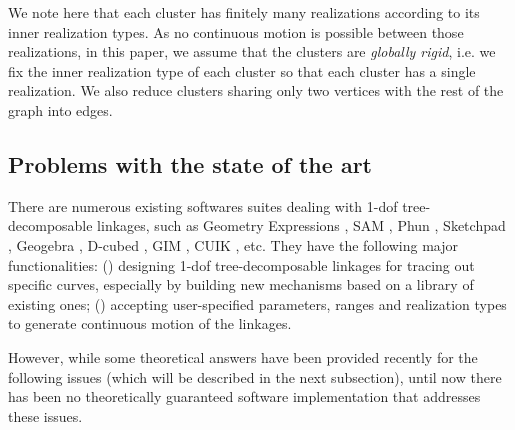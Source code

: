 \documentclass[prodmode,acmtoms]{acmsmall}
\begin{document}
We note here that each cluster has finitely many realizations according to its inner realization types. 
As no continuous motion is possible between those realizations, 
in this paper, we assume that the clusters are \emph{globally rigid}, i.e. we fix the inner realization type of each cluster so that each cluster has a single realization. 
We also reduce clusters sharing only two vertices with the rest of the graph into edges. 









\subsection{Problems with the state of the art} \label{sec:soa}

There are numerous existing %
softwares suites dealing with 1-dof tree-decomposable linkages, 
such as Geometry Expressions \citep{todd2007geometry}, SAM \citep{artasengineering2010sam},  Phun \citep{algoryx2013algodoo}, Sketchpad \citep{keycurriculum1995geometer}, Geogebra \citep{geogebrainc2001geogebra}, D-cubed \citep{siemens1999d},  GIM \citep{petuya2014educational}, CUIK \citep{porta2014open}, 
etc. 
They have the following major functionalities: 
() designing 1-dof tree-decomposable linkages for tracing out specific curves, 
especially by building new mechanisms based on a library of existing ones;
() accepting user-specified parameters, ranges and realization types to generate 
continuous motion of the linkages. 

\smallskip
However, while some theoretical answers have been provided recently for the following issues (which will be described in the next subsection), until now there has been no theoretically guaranteed software implementation that addresses these issues.
\end{document}
